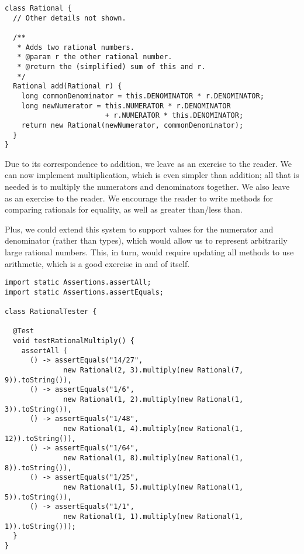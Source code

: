 \begin{lstlisting}[language=MyJava]
class Rational {
  // Other details not shown.

  /**
   * Adds two rational numbers.
   * @param r the other rational number.
   * @return the (simplified) sum of this and r.
   */
  Rational add(Rational r) {
    long commonDenominator = this.DENOMINATOR * r.DENOMINATOR;
    long newNumerator = this.NUMERATOR * r.DENOMINATOR 
                        + r.NUMERATOR * this.DENOMINATOR;
    return new Rational(newNumerator, commonDenominator);
  }
}
\end{lstlisting}

Due to its correspondence to addition, we leave  as an exercise to the reader. 
We can now implement multiplication, which is even simpler than addition; all that is needed is to multiply the numerators and denominators together. 
We also leave  as an exercise to the reader. 
We encourage the reader to write methods for comparing rationals for equality, as well as greater than/less than. 

Plus, we could extend this system to support  values for the numerator and denominator (rather than  types), which would allow us to represent arbitrarily large rational numbers. 
This, in turn, would require updating all methods to use  arithmetic, which is a good exercise in and of itself.

\enlargethispage{-6\baselineskip}
\begin{lstlisting}[language=MyJava]
import static Assertions.assertAll;
import static Assertions.assertEquals;

class RationalTester {

  @Test
  void testRationalMultiply() {
    assertAll (
      () -> assertEquals("14/27", 
              new Rational(2, 3).multiply(new Rational(7, 9)).toString()),
      () -> assertEquals("1/6", 
              new Rational(1, 2).multiply(new Rational(1, 3)).toString()),
      () -> assertEquals("1/48", 
              new Rational(1, 4).multiply(new Rational(1, 12)).toString()),
      () -> assertEquals("1/64", 
              new Rational(1, 8).multiply(new Rational(1, 8)).toString()),
      () -> assertEquals("1/25", 
              new Rational(1, 5).multiply(new Rational(1, 5)).toString()),
      () -> assertEquals("1/1", 
              new Rational(1, 1).multiply(new Rational(1, 1)).toString()));
  }
}
\end{lstlisting}

